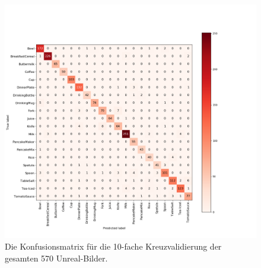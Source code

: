 \begin{figure}
	\includegraphics[scale=.5]{img/chapter6/unrealEx1_cof_matrix.png}
\caption[Konfusionsmatrix des gesamten Unreal-Bilder Datensatzes]{Die Konfusionsmatrix für die 10-fache Kreuzvalidierung der gesamten 570 Unreal-Bilder.}
\label{fig:unreal_1_confMatrix}
\end{figure}

